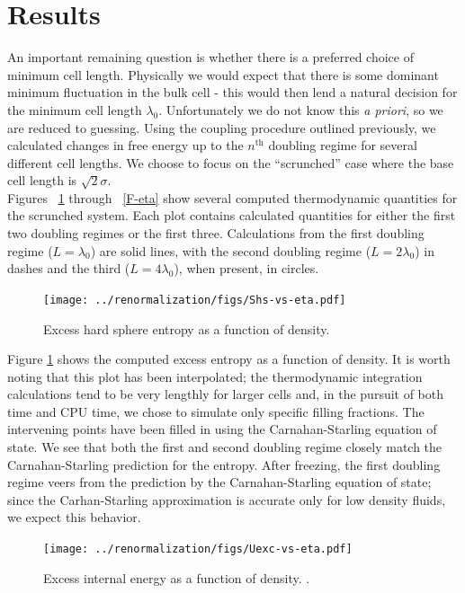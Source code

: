 \documentclass[12pt]{article}
\newcommand{\ignore}[1]{}
\begin{document}
\section{Results}
An important remaining question is whether there is a preferred choice of minimum cell length. Physically we would expect that there is some dominant minimum fluctuation in the bulk cell - this would then lend a natural decision for the minimum cell length $\lambda_0$. Unfortunately we do not know this {\it a priori}, so we are reduced to guessing. Using the coupling procedure outlined previously, we calculated changes in free energy up to the $n^{\text{th}}$ doubling regime for several different cell lengths. We choose to focus on the ``scrunched'' case where the base cell length is $\sqrt2\sigma$.\\

Figures ~\ref{Shs-eta} through ~\ref{F-eta} show several computed thermodynamic quantities for the scrunched system. Each plot contains calculated quantities for either the first two doubling regimes or the first three. Calculations from the first doubling regime ($L=\lambda_0$) are solid lines, with the second doubling regime ($L = 2\lambda_0$) in dashes and the third ($L = 4\lambda_0$), when present, in circles. 

\begin{figure}
\centering
    \texttt{[image: ../renormalization/figs/Shs-vs-eta.pdf]}
    \caption{Excess hard sphere entropy as a function of density.}
    \label{Shs-eta}
\end{figure}
\ignore{Filling fraction or density? Value in distinction? We never use number density for the sake of units...}
Figure \ref{Shs-eta} shows the computed excess entropy as a function of density. It is worth noting that this plot has been interpolated; the thermodynamic integration calculations tend to be very lengthly for larger cells and, in the pursuit of both time and CPU time, we chose to simulate only specific filling fractions. The intervening points have been filled in using the Carnahan-Starling equation of state. We see that both the first and second doubling regime closely match the Carnahan-Starling prediction for the entropy. After freezing, the first doubling regime veers from the prediction by the Carnahan-Starling equation of state; since the Carhan-Starling approximation is accurate only for low density fluids, we expect this behavior.\\
\begin{figure}
    \centering
    \texttt{[image: ../renormalization/figs/Uexc-vs-eta.pdf]}
    \caption{Excess internal energy as a function of density. .}
    \label{U-eta}
\end{figure}
\end{document}
